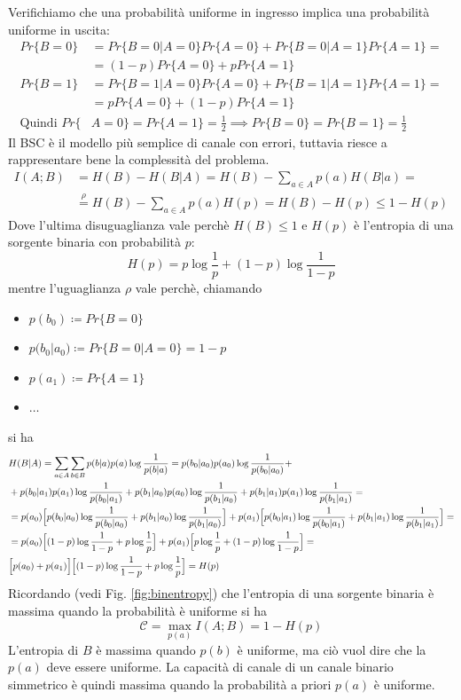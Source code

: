 Verifichiamo che una probabilit\`a uniforme in ingresso implica una probabilit\`a uniforme in uscita:
\begin{align*}
    Pr\{B=0\} &= Pr\{B=0|A=0\}Pr\{A=0\} + Pr\{B=0|A=1\}Pr\{A=1\} = \\
    &= (1-p)Pr\{A=0\} + pPr\{A=1\} \\
    Pr\{B=1\} &= Pr\{B=1|A=0\}Pr\{A=0\} + Pr\{B=1|A=1\}Pr\{A=1\} = \\
    &= pPr\{A=0\} + (1-p)Pr\{A=1\} \\
    \text{Quindi }Pr\{&A=0\} = Pr\{A=1\} = \frac{1}{2} \implies Pr\{B=0\} = Pr\{B=1\} = \frac{1}{2}
\end{align*}
Il BSC \`e il modello più semplice di canale con errori, tuttavia riesce a rappresentare bene la complessità del problema.
\begin{align*}
    I(A;B) &= H(B) - H(B|A) = H(B) - \sum_{a \in A}p(a) H(B|a) = \\
    & \overset{\rho}{=} H(B) - \sum_{a \in A} p(a) H(p) = H(B) - H(p) \leq 1 - H(p)
\end{align*}
Dove l'ultima disuguaglianza vale perch\`e $H(B) \leq 1$ e $H(p)$ \`e l'entropia di una sorgente binaria con probabilit\`a $p$:
\begin{equation*}
    H(p) = p \log \frac{1}{p} + (1-p) \log \frac{1}{1-p}
\end{equation*}
mentre l'uguaglianza $\rho$ vale perch\`e, chiamando 
\begin{itemize}
    \item $p(b_0) \coloneqq Pr\{B=0\}$
    \item $p(b_0|a_0) \coloneqq Pr\{B=0|A=0\} = 1-p $ 
    \item $p(a_1) \coloneqq Pr\{A=1\}$
    \item $\dots$
\end{itemize} si ha
\begin{align*}
&H(B|A) = \sum_{a \in A} \sum_{b \in B} p(b|a)p(a)\log \frac{1}{p({b|a})} = p(b_0|a_0)p(a_0)\log \frac{1}{p({b_0|a_0})} + \\
&+p(b_0|a_1)p(a_1)\log \frac{1}{p({b_0|a_1})} + p(b_1|a_0)p(a_0)\log \frac{1}{p({b_1|a_0})} + p(b_1|a_1)p(a_1)\log \frac{1}{p({b_1|a_1})} = \\
&=p(a_0) \Big [p(b_0|a_0)\log \frac{1}{p({b_0|a_0})} + p(b_1|a_0)\log \frac{1}{p({b_1|a_0})} \Big ] + p(a_1) \Big [p(b_0|a_1)\log \frac{1}{p({b_0|a_1})} + p(b_1|a_1)\log \frac{1}{p({b_1|a_1})} \Big ] = \\
&=p(a_0) \Big [(1-p)\log \frac{1}{1-p} + p \log \frac{1}{p} \Big ] + p(a_1) \Big[ p \log \frac{1}{p} + (1-p)\log \frac{1}{1-p}  \Big ] = \\
& \Big [ p(a_0) + p(a_1) \Big ] \Big [ (1-p)\log \frac{1}{1-p} + p \log \frac{1}{p} \Big ] = H(p)
\end{align*}
Ricordando (vedi Fig. \ref{fig:binentropy}) che l'entropia di una sorgente binaria \`e massima quando la probabilit\`a \`e uniforme si ha
\begin{equation}
    \mathcal{C} = \max_{p(a)} I(A;B) = 1 - H(p)
\end{equation}
L'entropia di $B$ \`e massima quando $p(b)$ \`e uniforme, ma ci\`o vuol dire che la $p(a)$ deve essere uniforme. La capacit\`a di canale di un canale binario simmetrico \`e quindi massima quando la probabilit\`a a priori $p(a)$ \`e uniforme.

